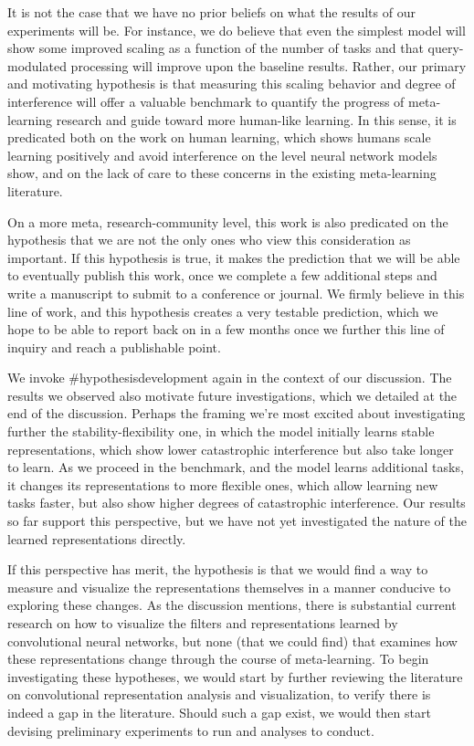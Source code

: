 It is not the case that we have no prior beliefs on what the results of our experiments will be. For instance, we do believe that even the simplest model will show some improved scaling as a function of the number of tasks and that query-modulated processing will improve upon the baseline results. Rather, our primary and motivating hypothesis is that measuring this scaling behavior and degree of interference will offer a valuable benchmark to quantify the progress of meta-learning research and guide toward more human-like learning. In this sense, it is predicated both on the work on human learning, which shows humans scale learning positively and avoid interference on the level neural network models show, and on the lack of care to these concerns in the existing meta-learning literature. 

On a more meta, research-community level, this work is also predicated on the hypothesis that we are not the only ones who view this consideration as important. If this hypothesis is true, it makes the prediction that we will be able to eventually publish this work, once we complete a few additional steps and write a manuscript to submit to a conference or journal. We firmly believe in this line of work, and this hypothesis creates a very testable prediction, which we hope to be able to report back on in a few months once we further this line of inquiry and reach a publishable point.   

We invoke \#hypothesisdevelopment again in the context of our discussion. The results we observed also motivate future investigations, which we detailed at the end of the discussion. Perhaps the framing we’re most excited about investigating further the stability-flexibility one, in which the model initially learns stable representations, which show lower catastrophic interference but also take longer to learn. As we proceed in the benchmark, and the model learns additional tasks, it changes its representations to more flexible ones, which allow learning new tasks faster, but also show higher degrees of catastrophic interference. Our results so far support this perspective, but we have not yet investigated the nature of the learned representations directly.

If this perspective has merit, the hypothesis is that we would find a way to measure and visualize the representations themselves in a manner conducive to exploring these changes. As the discussion mentions, there is substantial current research on how to visualize the filters and representations learned by convolutional neural networks, but none (that we could find) that examines how these representations change through the course of meta-learning. To begin investigating these hypotheses, we would start by further reviewing the literature on convolutional representation analysis and visualization, to verify there is indeed a gap in the literature. Should such a gap exist, we would then start devising preliminary experiments to run and analyses to conduct.  

